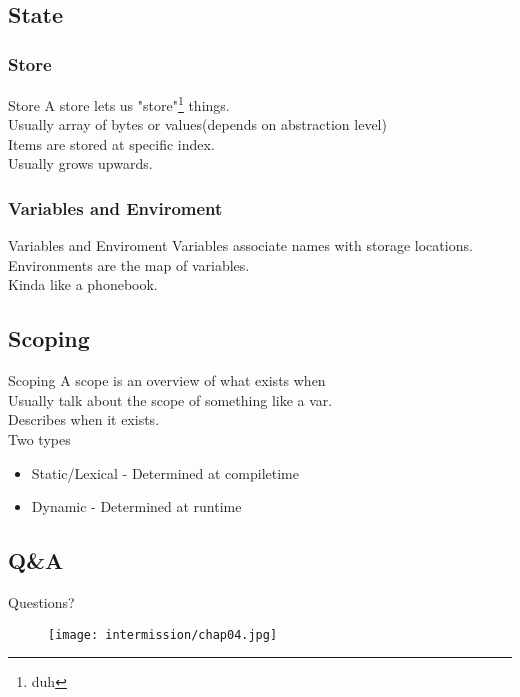 \subsection{State}
\subsubsection*{Store}
\begin{frame}{Store}
    A store lets us "store"\footnote{duh} things.\\
    Usually array of bytes or values(depends on abstraction level)\\
    Items are stored at specific index.\\
    Usually grows upwards.
\end{frame}

\subsubsection*{Variables and Enviroment}
\begin{frame}{Variables and Enviroment}
    Variables associate names with storage locations.\\
    Environments are the map of variables.\\
    Kinda like a phonebook.
\end{frame}

\subsection{Scoping}
\begin{frame}{Scoping}
    A scope is an overview of what exists when\\
    Usually talk about the scope of something like a var.\\
    Describes when it exists.\\
    Two types
    \begin{itemize}[<+->]
        \item Static/Lexical - Determined at compiletime
        \item Dynamic - Determined at runtime
    \end{itemize}
\end{frame}

\subsection*{Q\&A}
\begin{frame}{Questions?}
    \begin{figure}
        \centering
        \texttt{[image: intermission/chap04.jpg]}
    \end{figure}
\end{frame}